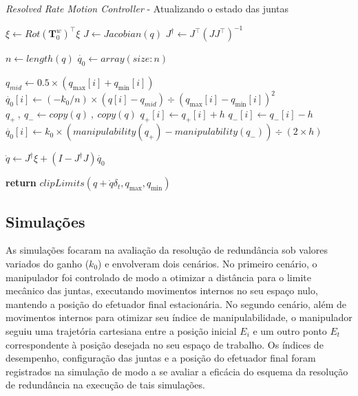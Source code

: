 \begin{algorithm}
    \caption{\emph{Resolved Rate Motion Controller} {-} Atualizando o estado das juntas}\label{rrc-alg}
    \begin{algorithmic}[1]
        \State$\xi \gets {Rot(\mathbf{T}^w_0)}^\top \xi$
        \State$J \gets Jacobian(q)$
        \State$J^\dag \gets J^\top {(J J^\top)}^{-1}$

        \State$n \gets length(q)$
        \State$\dot{q_0} \gets array(size: n)$

         
        \State$q_{mid} \gets 0.5 \times (q_{\max}[i] + q_{\min}[i])$
        \State$\dot{q_0}[i] \gets (-k_0 / n) \times (q[i] - q_{mid}) \div {{(q_{\max}[i] - q_{\min}[i])}^2}$
        \State$q_{+} \ , \ q_{-} \gets copy(q) \ , \ copy(q)$
        \State$q_{+}[i] \gets q_{+}[i] + h$
        \State$q_{-}[i] \gets q_{-}[i] - h$
        \State$\dot{q_0}[i] \gets k_0 \times (manipulability(q_{+}) - manipulability(q_{-})) \div (2 \times h)$
        \EndIf{}
        \EndFor{}

        \State$\dot{q} \gets J^\dag \xi + (I - J^\dag J) \dot{q_0}$

        \State\textbf{return} $clipLimits(q + \dot{q} \delta_t, q_{\max}, q_{\min})$ 
        \EndProcedure\end{algorithmic}
\end{algorithm}

\subsection*{Simulações}

As simulações focaram na avaliação da resolução de redundância
sob valores variados do ganho (\(k_0\)) e envolveram dois cenários. No primeiro
cenário, o manipulador foi controlado de modo a otimizar a distância para o limite mecânico das juntas, 
executando movimentos internos no seu espaço nulo, mantendo a posição do efetuador final estacionária.
No segundo cenário, além de movimentos internos para otimizar seu índice de manipulabilidade, o manipulador 
seguiu uma trajetória cartesiana entre a posição inicial \(E_i\) e um outro ponto \(E_t\) correspondente à posição desejada
no seu espaço de trabalho. Os índices de desempenho, configuração das juntas e a 
posição do efetuador final foram registrados na simulação de modo a se avaliar 
a eficácia do esquema da resolução de redundância na execução de tais simulações.

